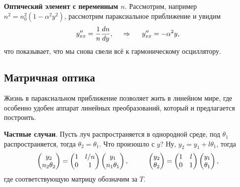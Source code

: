\textbf{Оптический элемент с переменным $n$}. Рассмотрим, например $n^2 = n_0^2 (1-\alpha^2 y^2)$, рассмотрим параксиальное приближение и увидим
\begin{equation*}
    y''_{xx} = \frac{1}{n} \frac{d n}{d y},
    \hspace{0.5cm} \Rightarrow \hspace{0.5cm}
    y''_{xx} = - \alpha^2 y,
\end{equation*}
что показывает, что мы снова свели всё к гармоническому осциллятору. 



\subsection{Матричная оптика}

 Жизнь в параксиальном приближение позволяет жить в линейном мире, где особенно удобен аппарат линейных преобразований, который и предлагается построить.

 \textbf{Частные случаи}. Пусть луч распространяется в однородной среде, под $\theta_1$ распространяется, тогда $\theta_2 = \theta_1$. Что произошло с $y$? Ну, $y_2 = y_1 + l \theta_1$, тогда
\begin{equation}
    \begin{pmatrix}
        y_2 \\ n_2 \theta_2
    \end{pmatrix} = 
    \begin{pmatrix}
        1 & l/n \\
        0 & 1 \\
    \end{pmatrix} 
    \begin{pmatrix}
        y_1 \\ n_1 \theta_1 
    \end{pmatrix},
    \hspace{1 cm}
    \begin{pmatrix}
        y_2 \\ \theta_2
    \end{pmatrix} = 
    \begin{pmatrix}
        1 & l \\
        0 & 1 \\
    \end{pmatrix} 
    \begin{pmatrix}
        y_1 \\ \theta_1 
    \end{pmatrix}, 
\end{equation}
где соответствующую матрицу обозначим за $T$. 

